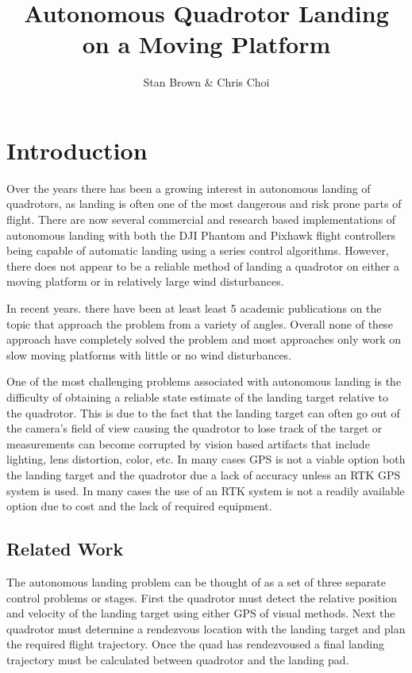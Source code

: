 \documentclass[11pt, twocolumn]{article}
\begin{document}
\title{Autonomous Quadrotor Landing on a Moving Platform}
\author{Stan Brown \& Chris Choi}
\date{}
\maketitle

\section{Introduction}
Over the years there has been a growing interest in autonomous landing of quadrotors, as landing is often one of the most dangerous and risk prone parts of flight. There are now several commercial and research based implementations of autonomous landing with both the DJI Phantom and Pixhawk flight controllers being capable of automatic landing using a series control algorithms. However, there does not appear to be a reliable method of landing a quadrotor on either a moving platform or in relatively large wind disturbances. 

In recent years. there have been at least least 5 academic publications on the topic \cite{Lee2012, Kim2014, Voos2010, Friis2009, Ling2014, Herisse2012} that approach the problem from a variety of angles. Overall none of these approach have completely solved the problem and most approaches only work on slow moving platforms with little or no wind disturbances. 

One of the most challenging problems associated with autonomous landing is the difficulty of obtaining a reliable state estimate of the landing target relative to the quadrotor. This is due to the fact that the landing target can often go out of the camera's field of view causing the quadrotor to lose track of the target or measurements can become corrupted by vision based artifacts that include lighting, lens distortion, color, etc. In many cases GPS is not a viable option both the landing target and the quadrotor due a lack of accuracy unless an RTK GPS system is used. In many cases the use of an RTK system is not a readily available option due to cost and the lack of required equipment. 

\subsection{Related Work}
The autonomous landing problem can be thought of as a set of three separate control problems or stages. First the quadrotor must detect the relative position and velocity of the landing target using either GPS of visual methods. Next the quadrotor must determine a rendezvous location with the landing target and plan the required flight trajectory. Once the quad has rendezvoused a final landing trajectory must be calculated between quadrotor and the landing pad. 
\end{document}

